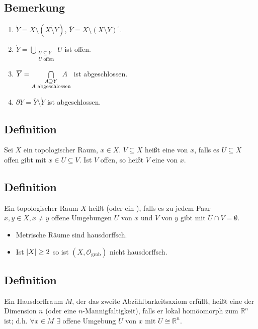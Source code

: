 \subsection[Bemerkung: Gleichungen für Inneres, Abschluss und Rand]{Bemerkung} %
\label{sub:120}
\begin{enumerate}[1)]
	\item $\mathring Y = X \setminus (\overline{X \setminus Y} )$, $\overline{Y} = X \setminus (X \setminus Y)^\circ$.
	\item $\mathring Y = \bigcup_{\substack{U \subseteq Y \\ U \text{ offen}}} U$ ist offen.
	\item $\overline{Y} = {\bigcap\limits_{\substack{A \supseteq Y \\ A \text{ abgeschlossen}}} \mkern-25mu A} \enspace$ ist abgeschlossen.
	\item $\partial Y = \overline{Y} \setminus \mathring Y $ ist abgeschlossen.
\end{enumerate}

\subsection[Definition: Umgebung]{Definition} %
\label{sub:121}
Sei $X$ ein topologischer Raum, $x \in X$. $V \subseteq X$ heißt eine  von $x$, falls es $U \subseteq X$ offen gibt mit $x \in U \subseteq V$. Ist $V$
offen, so heißt $V$ eine  von $x$. 

\subsection[Definition: Hausdorffraum]{Definition} %
\label{sub:122}
Ein topologischer Raum $X$ heißt  (oder ein ), falls es zu jedem Paar $x,y \in X, x \not= y$ offene Umgebungen $U$ von $x$ und
$V$ von $y$ gibt mit $U \cap V = \emptyset$.
\begin{itemize}
	\item Metrische Räume sind hausdorffsch.
	\item Ist $\abs*{X} \ge 2 $ so ist $(X, \mathcal{O}_{\text{grob}} )$ nicht hausdorffsch.
\end{itemize}

\subsection[Definition: topologische Mannigfaltigkeit]{Definition} %
\label{sub:123}
Ein Hausdorffraum $M$, der das zweite Abzählbarkeitsaxiom erfüllt, heißt eine  der Dimension $n$ (oder eine $n$-Mannigfaltigkeit), 
falls er lokal homöomorph zum $\mathds{R}^n$ ist; d.h. $\forall x \in M$ $\exists$ offene Umgebung $U$ von $x$ mit $U \cong \mathds{R}^n$.
\newpage

